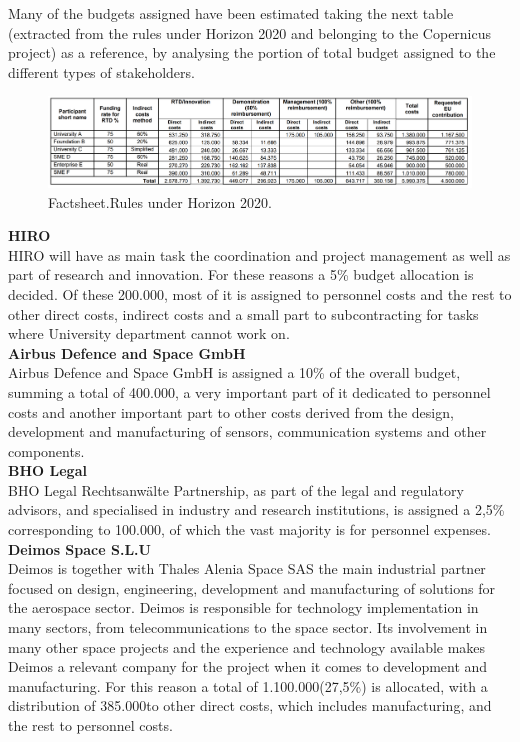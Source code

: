 Many of the budgets assigned have been estimated taking the next table (extracted from the rules under Horizon 2020 and belonging to the Copernicus project) as a reference, by analysing the portion of total budget assigned to the different types of stakeholders.


\begin{figure}[H]
\centering
\includegraphics[scale=0.45]{./images/budget/rulesBudget2020}
\caption{Factsheet.Rules under Horizon 2020.}
\label{rules}
\end{figure}

\textbf{HIRO}\\

HIRO will have as main task the coordination and project management as well as part of research and innovation. For these reasons a 5\% budget allocation is decided. Of these 200.000\EUR, most of it is assigned to personnel costs and the rest to other direct costs, indirect costs and a small part to subcontracting for tasks where University department cannot work on.\\
 
\textbf{Airbus Defence and Space GmbH}\\

Airbus Defence and Space GmbH is assigned a 10\% of the overall budget, summing a total of 400.000\EUR, a very important part of it dedicated to personnel costs and another important part to other costs derived from the design, development and manufacturing of sensors, communication systems and other components.\\

\textbf{BHO Legal}\\

BHO Legal Rechtsanwälte Partnership, as part of the legal and regulatory advisors, and specialised in industry and research institutions, is assigned a 2,5\% corresponding to 100.000\EUR, of which the vast majority is for personnel expenses.\\

\textbf{Deimos Space S.L.U}\\

Deimos is together with Thales Alenia Space SAS the main industrial partner focused on design, engineering, development and manufacturing of solutions for the aerospace sector. Deimos is responsible for technology implementation in many sectors, from telecommunications to the space sector. Its involvement in many other space projects and the experience and technology available makes Deimos a relevant company for the project when it comes to development and manufacturing. For this reason a total of 1.100.000\EUR (27,5\%) is allocated, with a distribution of 385.000\EUR to other direct costs, which includes manufacturing, and the rest to personnel costs.\\
 
